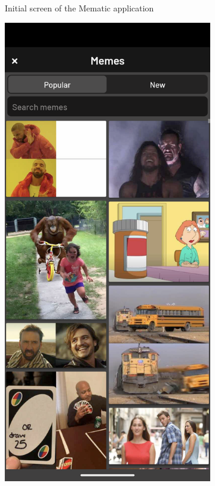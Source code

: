 \begin{figure}
\begin{subfigure}{0.3\textwidth}
        \caption{Initial screen of the Mematic application}
        \label{fig:mematic-initial}
    \end{subfigure}
    \begin{subfigure}{0.3\textwidth}
        \centering
        \includegraphics[width=\linewidth]{text/img/mematic/template-select.png}

\end{subfigure}
\end{figure}
